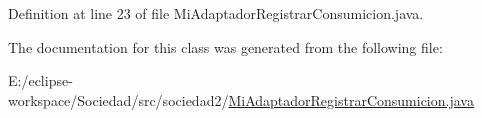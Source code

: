 Definition at line 23 of file Mi\+Adaptador\+Registrar\+Consumicion.\+java.



The documentation for this class was generated from the following file\+:\begin{DoxyCompactItemize}
\item 
E\+:/eclipse-\/workspace/\+Sociedad/src/sociedad2/\mbox{\hyperlink{_mi_adaptador_registrar_consumicion_8java}{Mi\+Adaptador\+Registrar\+Consumicion.\+java}}\end{DoxyCompactItemize}
